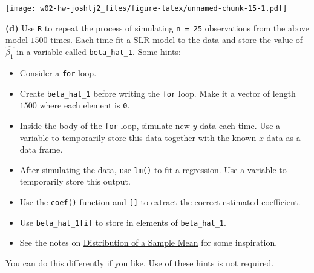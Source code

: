 \documentclass[]{article}
\newenvironment{Shaded}{\begin{snugshade}}{\end{snugshade}}
\newcommand{\KeywordTok}[1]{\textcolor[rgb]{0.13,0.29,0.53}{\textbf{#1}}}
\newcommand{\DataTypeTok}[1]{\textcolor[rgb]{0.13,0.29,0.53}{#1}}
\newcommand{\DecValTok}[1]{\textcolor[rgb]{0.00,0.00,0.81}{#1}}
\newcommand{\FloatTok}[1]{\textcolor[rgb]{0.00,0.00,0.81}{#1}}
\newcommand{\StringTok}[1]{\textcolor[rgb]{0.31,0.60,0.02}{#1}}
\newcommand{\CommentTok}[1]{\textcolor[rgb]{0.56,0.35,0.01}{\textit{#1}}}
\newcommand{\ControlFlowTok}[1]{\textcolor[rgb]{0.13,0.29,0.53}{\textbf{#1}}}
\newcommand{\OperatorTok}[1]{\textcolor[rgb]{0.81,0.36,0.00}{\textbf{#1}}}
\newcommand{\NormalTok}[1]{#1}
\providecommand{\tightlist}{%
  \setlength{\itemsep}{0pt}\setlength{\parskip}{0pt}}
\begin{document}
\texttt{[image: w02-hw-joshlj2\_files/figure-latex/unnamed-chunk-15-1.pdf]}

\textbf{(d)} Use \texttt{R} to repeat the process of simulating
\texttt{n\ =\ 25} observations from the above model \(1500\) times. Each
time fit a SLR model to the data and store the value of
\(\hat{\beta_1}\) in a variable called \texttt{beta\_hat\_1}. Some
hints:

\begin{itemize}
\tightlist
\item
  Consider a \texttt{for} loop.
\item
  Create \texttt{beta\_hat\_1} before writing the \texttt{for} loop.
  Make it a vector of length \(1500\) where each element is \texttt{0}.
\item
  Inside the body of the \texttt{for} loop, simulate new \(y\) data each
  time. Use a variable to temporarily store this data together with the
  known \(x\) data as a data frame.
\item
  After simulating the data, use \texttt{lm()} to fit a regression. Use
  a variable to temporarily store this output.
\item
  Use the \texttt{coef()} function and \texttt{{[}{]}} to extract the
  correct estimated coefficient.
\item
  Use \texttt{beta\_hat\_1{[}i{]}} to store in elements of
  \texttt{beta\_hat\_1}.
\item
  See the notes on
  \href{http://daviddalpiaz.github.io/appliedstats/introduction-to-r.html\#distribution-of-a-sample-mean}{Distribution
  of a Sample Mean} for some inspiration.
\end{itemize}

You can do this differently if you like. Use of these hints is not
required.

\begin{Shaded}
\end{Shaded}
\end{document}

